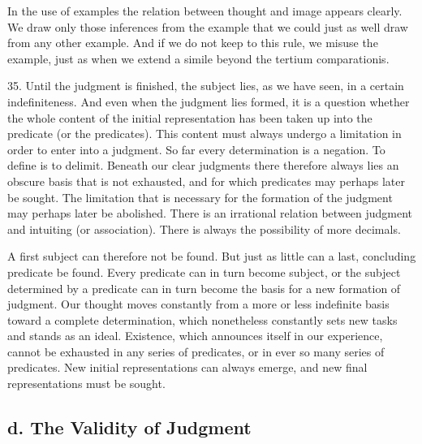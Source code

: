 \documentclass[12pt,a4paper]{book}
\newcommand{\opage}[1]{\marginnote{\footnotesize\textit{[#1]}}}
\begin{document}
In the use of examples the relation between thought and image appears
clearly. We draw only those inferences from the example that we could just
as well draw from any other example. And if we do not keep to this rule, we
misuse the example, just as when we extend a simile beyond the tertium
comparationis.

35. Until the judgment is finished, the subject lies, as we have seen, in a
certain indefiniteness. And even when the judgment lies formed, it is a
question whether the whole content of the initial representation has been
taken up into the predicate (or the predicates). This content must always
undergo a limitation in order to enter into a judgment. So far every
determination is a negation. To define is to delimit. Beneath our clear
judgments there therefore always lies an obscure basis that is not
exhausted, and for which predicates may perhaps later be sought. The
limitation that is necessary for the formation of the judgment may perhaps
later be abolished. There is an irrational relation between judgment and
intuiting (or association). There is always the possibility of more
decimals.

A first subject can therefore not be found. But just as little can a last,
concluding predicate be found. Every \opage{99}predicate can in turn become subject,
or the subject determined by a predicate can in turn become the basis for a
new formation of judgment. Our thought moves constantly from a more or less
indefinite basis toward a complete determination, which nonetheless
constantly sets new tasks and stands as an ideal. Existence, which
announces itself in our experience, cannot be exhausted in any series of
predicates, or in ever so many series of predicates. New initial
representations can always emerge, and new final representations must be
sought.

\subsection*{d. The Validity of Judgment}
\label{ssec:gyldighed}
\end{document}
